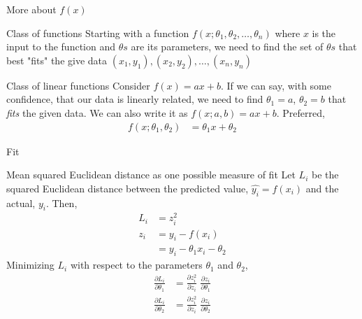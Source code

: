 \begin{frame}{More about $f(x)$}
	\begin{block}{Class of functions} 
		Starting with a function $f(x;\theta_1,\theta_2,\dots, \theta_n)$
		where $x$ is the input to the function and $\theta s$ are its parameters, 
		we need to find the set of $\theta s$ that best "fits" the give 
		data $(x_1,y_1),(x_2,y_2), \dots, (x_n,y_n)$ 
		
	\end{block}
	\begin{block}{Class of linear functions}
		Consider  $f(x) = ax+b$. If we can say, with some confidence, that 
		our data is linearly related,  we need to find  
		$\theta_1=a$, $\theta_2=b$ that {\it fits} the given data. 
		We can also write it as $f(x;a,b) = ax+b$. 
	\newline 
	Preferred,  
	\begin{align}
	f(x;\theta_1,\theta_2) &= \theta_1x+\theta_2	
	\end{align}

	\end{block}

\end{frame}
\begin{frame}{Fit}
	\begin{block}{Mean squared Euclidean distance as one possible measure of fit}
		Let $L_i$ be the squared Euclidean distance between the predicted 
		value, $\hat{y_i}=f(x_i)$ and the actual, $y_i$. Then,  
		\begin{align}
		L_i &=z_i^2 \\
		z_i &=y_i-f(x_i)\\
		    &=y_i-\theta_1 x_i-\theta_2 
		\end{align}
		Minimizing $L_i$ with respect to the parameters $\theta_1$ and $\theta_2$,
		\begin{align}
		\frac{\partial L_i}{\partial \theta_1} &= 
		\frac{\partial z_i^2}{\partial z_i} \; 
		\frac{\partial z_i}{\partial \theta_1}  \\
		\frac{\partial L_i}{\partial \theta_2} &= 
		\frac{\partial z_i^2}{\partial z_i} \; 
		\frac{\partial z_i}{\partial \theta_2} 
		\end{align}
	\end{block}
\end{frame}

